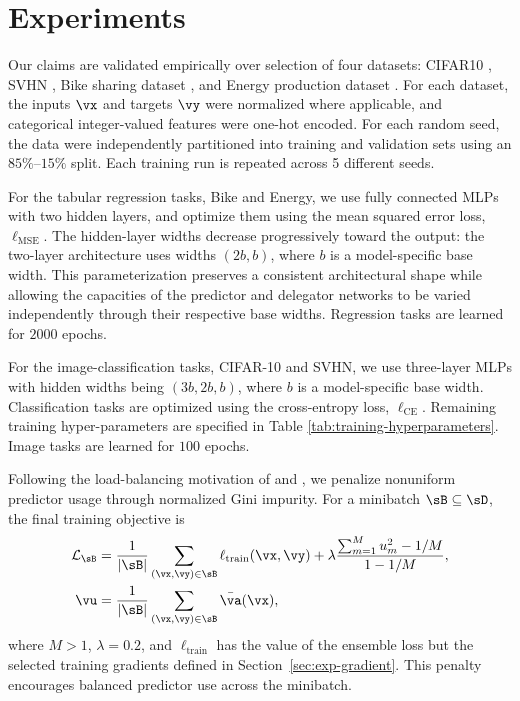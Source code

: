 \documentclass[10pt]{article} %
\begin{document}
\section{Experiments}

Our claims are validated empirically over selection of four datasets: CIFAR10 \citep{krizhevsky2009learning}, SVHN \citep{netzer2011reading}, Bike sharing dataset \citep{bike_sharing_275}, and Energy production dataset \citep{energydataset}. For each dataset, the inputs $\vx$ and targets $\vy$ were normalized where applicable, and categorical integer-valued features were one-hot encoded. For each random seed, the data were independently partitioned into training and validation sets using an $85\%$--$15\%$ split. Each training run is repeated across 5 different seeds.

For the tabular regression tasks, Bike and Energy, we use fully connected MLPs with two hidden layers, and optimize them using the mean squared error loss, $\ell_{\mathrm{MSE}}$. The hidden-layer widths decrease progressively toward the output: the two-layer architecture uses widths $(2b, b)$, where $b$ is a model-specific base width. This parameterization preserves a consistent architectural shape while allowing the capacities of the predictor and delegator networks to be varied independently through their respective base widths. Regression tasks are learned for $2000$ epochs.

For the image-classification tasks, CIFAR-10 and SVHN, we use three-layer MLPs with hidden widths being $(3b, 2b, b)$, where $b$ is a model-specific base width. Classification tasks are optimized using the cross-entropy loss, $\ell_{\mathrm{CE}}$. Remaining training hyper-parameters are specified in Table \ref{tab:training-hyperparameters}. Image tasks are learned for $100$ epochs.

Following the load-balancing motivation of \citet{shazeer2017outrageously} and \citet{fedus2022switch}, we penalize nonuniform predictor usage through normalized Gini impurity. For a minibatch $\sB\subseteq\sD$, the final training objective is
\begin{equation}\label{eq:training-objective}
\begin{aligned}
    \mathcal{L}_{\sB}
    &= \frac{1}{|\sB|}\sum_{(\vx,\vy)\in\sB}\ell_{\mathrm{train}}(\vx,\vy)
       +\lambda\frac{\sum_{m=1}^M u_m^2-1/M}{1-1/M},\\
    \vu &= \frac{1}{|\sB|}\sum_{(\vx,\vy)\in\sB}\bar{\va}(\vx),
\end{aligned}
\end{equation}
where $M>1$, $\lambda=0.2$, and $\ell_{\mathrm{train}}$ has the value of the ensemble loss but the selected training gradients defined in Section~\ref{sec:exp-gradient}. This penalty encourages balanced predictor use across the minibatch.
\end{document}
